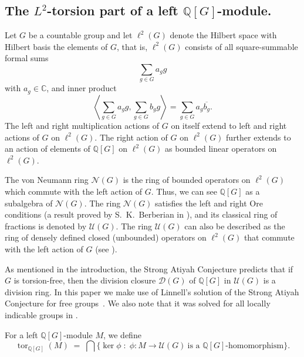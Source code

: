\documentclass{amsart}
\theoremstyle{definition}
\theoremstyle{remark}
\DeclareMathOperator{\tor}{tor}
\newcommand{\Q}{\mathbb{Q}}
\begin{document}
\subsection{The $L^2$-torsion part of a left ${\Q[G]}$-module.}\label{sect:l2}
Let $G$ be a countable group and let $\ell^2(G)$ denote the Hilbert space with Hilbert basis the elements of $G$, that is, $\ell^2(G)$ consists of all square-summable formal sums
\[
\sum_{g \in G} a_g g
\]
with $a_g \in \mathbb{C}$, and inner product
\[
\left\langle \sum_{g \in G} a_g g, \sum_{g \in G} b_g g \right\rangle = \sum_{g \in G} a_g \overline{b_g}.
\]
The left and right multiplication actions of $G$ on itself extend to left and right actions of $G$ on $\ell^2(G)$. The right action of $G$ on $\ell^2(G)$ further extends to an action of elements of $\Q[G]$ on $\ell^2(G)$    as bounded linear operators on $\ell^2(G)$.

The von Neumann ring $\mathcal{N}(G)$ is the ring of bounded operators on $\ell^2(G)$ which commute with the left action of $G$. Thus, we can see $\Q[G]$ as a subalgebra of $\mathcal{N}(G)$. The ring $\mathcal{N}(G)$ satisfies the left and right Ore conditions (a result proved by S.~K.~Berberian in \cite{Be82}), and its classical ring of fractions is denoted by $\mathcal{U}(G)$. The ring $\mathcal{U}(G)$ can also be described as the ring of densely defined closed (unbounded) operators on $\ell^2(G)$ that commute with the left action of $G$ (see \cite{Lu02,Ka19}).

As mentioned in the introduction, the Strong Atiyah Conjecture predicts that if $G$ is torsion-free, then the division closure $\mathcal{D}(G)$ of $\mathbb{Q}[G]$ in $\mathcal{U}(G)$ is a division ring. 
In this paper we make use of Linnell's solution of the Strong Atiyah Conjecture for free groups~\cite{Lin93}. We also note that it was solved for all locally indicable groups in \cite {JL19}.

For a left $\mathbb{Q}[G]$-module $M$, we define
\[
\tor_{\mathbb{Q}[G]}(M) \;=\; \bigcap \{ \ker \phi \;\colon\; \phi : M \to \mathcal U(G) \ \text{is a $\mathbb{Q}[G]$-homomorphism} \}.
\]
 
\end{document}
